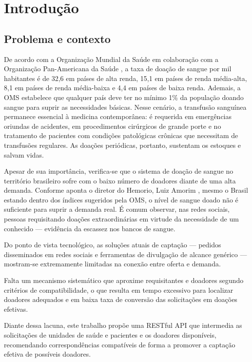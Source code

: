 \chapter{Introdução}

\section{Problema e contexto}

De acordo com a Organização Mundial da Saúde \citeyear{oms2020} em colaboração com a Organização Pan-Americana da Saúde \citeyear{opas2020}, a taxa de doação de sangue por mil habitantes é de 32,6 em países de alta renda, 15,1 em países de renda média-alta, 8,1 em países de renda média-baixa e 4,4 em países de baixa renda. Ademais, a OMS \citeyear{oms2020} estabelece que qualquer país deve ter no mínimo 1\% da população doando sangue para suprir as necessidades básicas. Nesse cenário, a transfusão sanguínea permanece essencial à medicina contemporânea: é requerida em emergências oriundas de acidentes, em procedimentos cirúrgicos de grande porte e no tratamento de pacientes com condições patológicas crônicas que necessitam de transfusões regulares. As doações periódicas, portanto, sustentam os estoques e salvam vidas.

Apesar de sua importância, verifica-se que o sistema de doação de sangue no território brasileiro sofre com o baixo número de doadores diante de uma alta demanda. Conforme aponta o diretor do Hemorio, Luiz Amorim \citeyear{hemorio2023}, mesmo o Brasil estando dentro dos índices sugeridos pela OMS, o nível de sangue doado não é suficiente para suprir a demanda real. É comum observar, nas redes sociais, pessoas requisitando doações extraordinárias em virtude da necessidade de um conhecido --- evidência da escassez nos bancos de sangue.

Do ponto de vista tecnológico, as soluções atuais de captação --- pedidos disseminados em redes sociais e ferramentas de divulgação de alcance genérico --- mostram-se extremamente limitadas na conexão entre oferta e demanda. 

Falta um mecanismo sistemático que aproxime requisitantes e doadores segundo critérios de compatibilidade, o que resulta em tempo excessivo para localizar doadores adequados e em baixa taxa de conversão das solicitações em doações efetivas.

Diante dessa lacuna, este trabalho propõe uma RESTful API que intermedia as solicitações de unidades de saúde e pacientes e os doadores disponíveis, recomendando correspondências compatíveis de forma a promover a captação efetiva de possíveis doadores.

